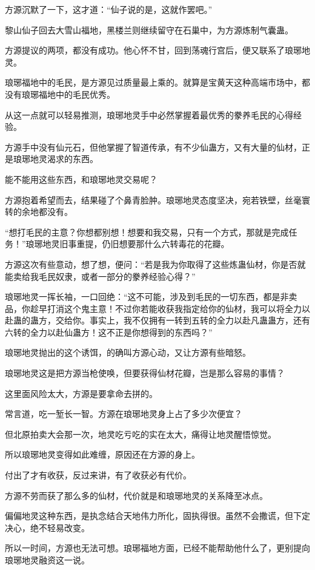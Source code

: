\begin{this_body}
方源沉默了一下，这才道：“仙子说的是，这就作罢吧。”

黎山仙子回去大雪山福地，黑楼兰则继续留守在石巢中，为方源炼制气囊蛊。

方源提议的两项，都没有成功。他心怀不甘，回到荡魂行宫后，便又联系了琅琊地灵。

琅琊福地中的毛民，是方源见过质量最上乘的。就算是宝黄天这种高端市场中，都没有琅琊福地中的毛民优秀。

从这一点就可以轻易推测，琅琊地灵手中必然掌握着最优秀的豢养毛民的心得经验。

方源手中没有仙元石，但他掌握了智道传承，有不少仙蛊方，又有大量的仙材，正是琅琊地灵渴求的东西。

能不能用这些东西，和琅琊地灵交易呢？

方源抱着希望而去，结果碰了个鼻青脸肿。琅琊地灵态度坚决，宛若铁壁，丝毫寰转的余地都没有。

“想打毛民的主意？你想都别想！想要和我交易，只有一个方式，那就是完成任务！”琅琊地灵旧事重提，仍旧想要那什么六转毒花的花瓣。

方源这次有些意动，想了想，便问：“若是我为你取得了这些炼蛊仙材，你是否就能卖给我毛民奴隶，或者一部分的豢养经验心得？”

琅琊地灵一挥长袖，一口回绝：“这不可能，涉及到毛民的一切东西，都是非卖品，你趁早打消这个鬼主意！不过你若能收获我指定给你的仙材，我可以将全力以赴蛊的蛊方，交给你。事实上，我不仅拥有一转到五转的全力以赴凡蛊蛊方，还有六转的全力以赴仙蛊方！这不正是你想得到的东西吗？”

琅琊地灵抛出的这个诱饵，的确叫方源心动，又让方源有些暗怒。

琅琊地灵这是把方源当枪使唤，但要获得仙材花瓣，岂是那么容易的事情？

这里面风险太大，方源是要拿命去拼的。

常言道，吃一堑长一智。方源在琅琊地灵身上占了多少次便宜？

但北原拍卖大会那一次，地灵吃亏吃的实在太大，痛得让地灵醒悟惊觉。

所以琅琊地灵变得如此难缠，原因还在方源的身上。

付出了才有收获，反过来讲，有了收获必有代价。

方源不劳而获了那么多的仙材，代价就是和琅琊地灵的关系降至冰点。

偏偏地灵这种东西，是执念结合天地伟力所化，固执得很。虽然不会撒谎，但下定决心，绝不轻易改变。

所以一时间，方源也无法可想。琅琊福地方面，已经不能帮助他什么了，更别提向琅琊地灵融资这一说。


\end{this_body}
